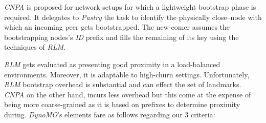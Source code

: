 \emph{CNPA} is proposed for network setups for which a lightweight
bootstrap phase is required.
It delegates to \emph{Pastry} the task to identify the physically
close--node with which an incoming peer gets bootstrapped. 
The new-comer assumes the bootstrapping nodes's \emph{ID} prefix 
and fills the remaining of its key using the techniques of \emph{RLM}.

\emph{RLM} gets evaluated as presenting good proximity in a load-balanced 
environments. Moreover, it is adaptable to high-churn settings.
Unfortunately, \emph{RLM} bootstrap overhead is substantial and can 
effect the set of landmarks.
\emph{CNPA} on the other hand, incurs less overhead but this come 
at the expense of being more coarse-grained as it is based on prefixes
to determine proximity during.
%
%
%
\emph{DynoMO}'s elements fare as follows regarding our $3$ criteria:
